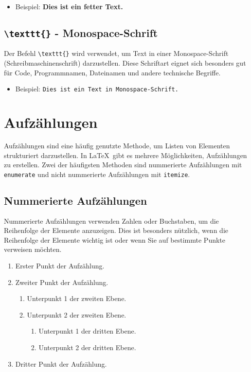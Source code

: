\begin{itemize}
    \item Beispiel: \textbf{Dies ist ein fetter Text.}
\end{itemize}

\subsection*{\texttt{\textbackslash texttt\{\}} - Monospace-Schrift}

Der Befehl \texttt{\textbackslash texttt\{\}} wird verwendet, um Text in einer
Monospace-Schrift (Schreibmaschinenschrift) darzustellen. Diese Schriftart
eignet sich besonders gut für Code, Programmnamen, Dateinamen und andere
technische Begriffe.

\begin{itemize}
    \item Beispiel: \texttt{Dies ist ein Text in Monospace-Schrift.}
\end{itemize}



\section*{Aufzählungen}

Aufzählungen sind eine häufig genutzte Methode, um Listen von Elementen
strukturiert darzustellen. In \LaTeX\ gibt es mehrere Möglichkeiten,
Aufzählungen zu erstellen. Zwei der häufigsten Methoden sind nummerierte
Aufzählungen mit \texttt{enumerate} und nicht nummerierte Aufzählungen mit
\texttt{itemize}.

\subsection*{Nummerierte Aufzählungen}

Nummerierte Aufzählungen verwenden Zahlen oder Buchstaben, um die Reihenfolge
der Elemente anzuzeigen. Dies ist besonders nützlich, wenn die Reihenfolge der
Elemente wichtig ist oder wenn Sie auf bestimmte Punkte verweisen möchten.

\begin{enumerate}
  \item Erster Punkt der Aufzählung.
  \item Zweiter Punkt der Aufzählung.
  \begin{enumerate}
      \item Unterpunkt 1 der zweiten Ebene.
      \item Unterpunkt 2 der zweiten Ebene.
      \begin{enumerate}
          \item Unterpunkt 1 der dritten Ebene.
          \item Unterpunkt 2 der dritten Ebene.
      \end{enumerate}
  \end{enumerate}
  \item Dritter Punkt der Aufzählung.
\end{enumerate}

